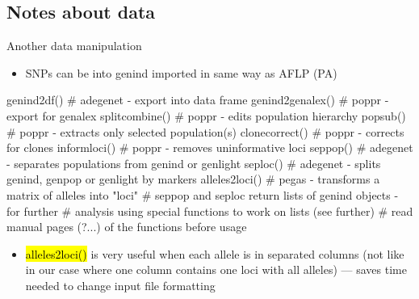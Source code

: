 \documentclass[compress, ucs, xelatex, 11pt, xcolor=svgnames,
	hyperref={
		bookmarks=true,
		unicode=true,
		colorlinks=true,
		pdftitle={Molecular data in R},
		plainpages=false,
		pdfauthor={Vojtech Zeisek},
		pdfsubject={Course about phylogeny and evolution in R},
		pdfcreator={XeLaTeX},
		pdfkeywords={R, evolution, phylogeny, molecular data},
		linkcolor=Tomato,
		anchorcolor=SaddleBrown,
		citecolor=Goldenrod,
		filecolor=DarkMagenta,
		menucolor=Sienna,
		urlcolor=DarkTurquoise,
		pdftex},
	url={hyphens, lowtilde} %
	]{beamer}
\renewcommand{\texttt}[1]{\hl{\ttfamily #1}}
\begin{document}
\subsection{Notes about data}

\begin{frame}[fragile]{Another data manipulation}
	\begin{itemize}
		\item SNPs can be into genind imported in same way as AFLP (PA)
	\end{itemize}
	\begin{spluscode}
    genind2df() # adegenet - export into data frame
    genind2genalex() # poppr - export for genalex
    splitcombine() # poppr - edits population hierarchy
    popsub() # poppr - extracts only selected population(s)
    clonecorrect() # poppr - corrects for clones
    informloci() # poppr - removes uninformative loci
    seppop() # adegenet - separates populations from genind or genlight
    seploc() # adegenet - splits genind, genpop or genlight by markers
    alleles2loci() # pegas - transforms a matrix of alleles into "loci"
    # seppop and seploc return lists of genind objects - for further
    # analysis using special functions to work on lists (see further)
    # read manual pages (?...) of the functions before usage
	\end{spluscode}
	\begin{itemize}
		\item \texttt{alleles2loci()} is very useful when each allele is in separated columns (not like in our case where one column contains one loci with all alleles) --- saves time needed to change input file formatting
	\end{itemize}
\end{frame}
\end{document}
